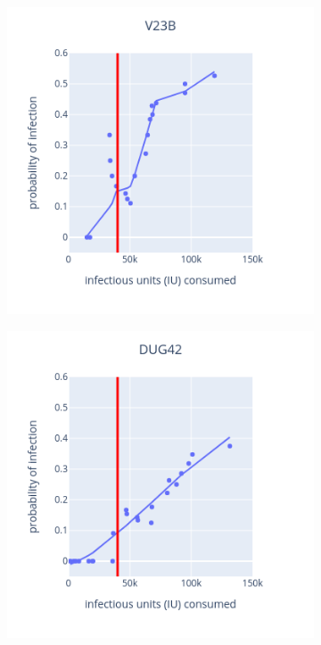 \documentclass[12pt,letterpaper,english,bibliography=totocnumbered, abstract=on]{scrartcl}
\begin{document}
\begin{figure}[H]
	\centering
	\begin{subfigure}{.49\textwidth}
		\includegraphics[width=\linewidth]{images/V23B_infection_probability.png}
	\end{subfigure}
	\begin{subfigure}{.49\textwidth}
		\includegraphics[width=\textwidth]{images/DUG42_infection_probability.png}

\end{subfigure}
\end{figure}
\end{document}
